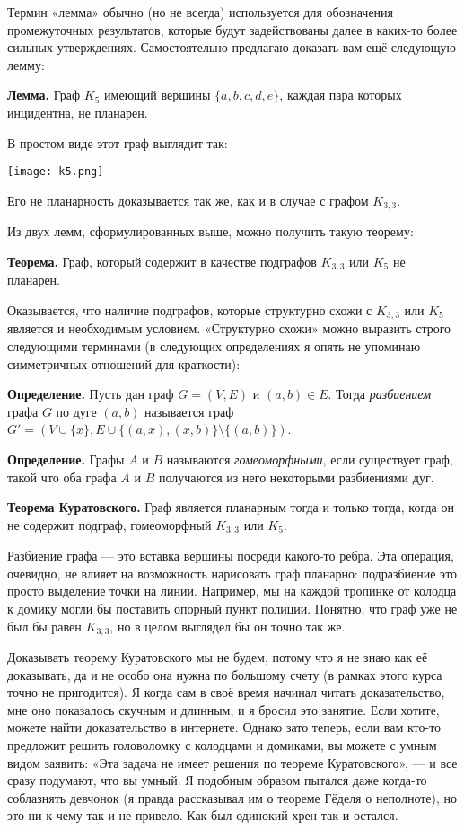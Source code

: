 Термин «лемма» обычно (но не всегда) используется для обозначения промежуточных результатов, которые будут задействованы далее в каких-то более сильных утверждениях. Самостоятельно предлагаю доказать вам ещё следующую лемму:

{\bfseries Лемма.} Граф $K_5$ имеющий вершины $\{a, b, c, d, e\}$, каждая пара которых инцидентна, не планарен.

В простом виде этот граф выглядит так:

\texttt{[image: k5.png]}

Его не планарность доказывается так же, как и в случае с графом $K_{3, 3}$.

Из двух лемм, сформулированных выше, можно получить такую теорему:

{\bfseries Теорема.} Граф, который содержит в качестве подграфов $K_{3, 3}$ или $K_5$ не планарен.

Оказывается, что наличие подграфов, которые структурно схожи с $K_{3, 3}$ или $K_5$ является и необходимым условием. «Структурно схожи» можно выразить строго следующими терминами (в следующих определениях я опять не упоминаю симметричных отношений для краткости):

{\bfseries Определение.} Пусть дан граф $G=(V, E)$ и $(a, b) \in E$. Тогда {\slshape разбиением} графа $G$ по дуге $(a, b)$ называется граф $G' = (V\cup\{x\}, E\cup\{(a, x), (x, b)\}\setminus\{(a, b)\})$.

{\bfseries Определение.} Графы $A$ и $B$ называются {\slshape гомеоморфными}, если существует граф, такой что оба графа $A$ и $B$ получаются из него некоторыми разбиениями дуг.

{\bfseries Теорема Куратовского.} Граф является планарным тогда и только тогда, когда он не содержит подграф, гомеоморфный $K_{3, 3}$ или $K_5$.

Разбиение графа — это вставка вершины посреди какого-то ребра. Эта операция, очевидно, не влияет на возможность нарисовать граф планарно: подразбиение это просто выделение точки на линии. Например, мы на каждой тропинке от колодца к домику могли бы поставить опорный пункт полиции. Понятно, что граф уже не был бы равен $K_{3, 3}$, но в целом выглядел бы он точно так же.

Доказывать теорему Куратовского мы не будем, потому что я не знаю как её доказывать, да и не особо она нужна по большому счету (в рамках этого курса точно не пригодится). Я когда сам в своё время начинал читать доказательство, мне оно показалось скучным и длинным, и я бросил это занятие. Если хотите, можете найти доказательство в интернете. Однако зато теперь, если вам кто-то предложит решить головоломку с колодцами и домиками, вы можете с умным видом заявить: «Эта задача не имеет решения по теореме Куратовского», — и все сразу подумают, что вы умный. Я подобным образом пытался даже когда-то соблазнять девчонок (я правда рассказывал им о теореме Гёделя о неполноте), но это ни к чему так и не привело. Как был одинокий хрен так и остался.

